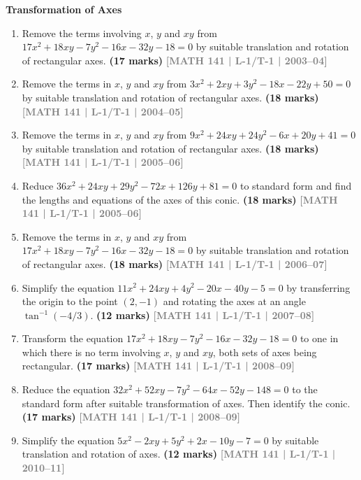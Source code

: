 \documentclass[12pt,a4paper]{article}
\newcommand{\yr}[1]{\hfill\textcolor{gray}{\small\textbf{[#1]}}}
\newcommand{\mk}[1]{\textcolor{orange!70!black}{\small\textbf{(#1 marks)}}}
\newcommand{\subtopic}[2]{%
  \vspace{10pt}
  \noindent\begin{tcolorbox}[colback=#1!8,colframe=#1,boxrule=0.6pt,arc=4pt,
    left=6pt,right=6pt,top=4pt,bottom=4pt]
    \small\bfseries\textcolor{#1}{#2}
  \end{tcolorbox}
  \vspace{2pt}
}
\begin{document}
\subtopic{cH}{Transformation of Axes}
\label{sub:s10-transform}

\begin{enumerate}

\item Remove the terms involving $x$, $y$ and $xy$ from $17x^{2}+18xy-7y^{2}-16x-32y-18=0$ by suitable translation and rotation of rectangular axes.
\mk{17} \yr{MATH 141 | L-1/T-1 | 2003--04}

\item Remove the terms in $x$, $y$ and $xy$ from $3x^{2}+2xy+3y^{2}-18x-22y+50=0$ by suitable translation and rotation of rectangular axes.
\mk{18} \yr{MATH 141 | L-1/T-1 | 2004--05}

\item Remove the terms in $x$, $y$ and $xy$ from $9x^{2}+24xy+24y^{2}-6x+20y+41=0$ by suitable translation and rotation of rectangular axes.
\mk{18} \yr{MATH 141 | L-1/T-1 | 2005--06}

\item Reduce $36x^{2}+24xy+29y^{2}-72x+126y+81=0$ to standard form and find the lengths and equations of the axes of this conic.
\mk{18} \yr{MATH 141 | L-1/T-1 | 2005--06}

\item Remove the terms in $x$, $y$ and $xy$ from $17x^{2}+18xy-7y^{2}-16x-32y-18=0$ by suitable translation and rotation of rectangular axes.
\mk{18} \yr{MATH 141 | L-1/T-1 | 2006--07}

\item Simplify the equation $11x^{2}+24xy+4y^{2}-20x-40y-5=0$ by transferring the origin to the point $(2,-1)$ and rotating the axes at an angle $\tan^{-1}(-4/3)$.
\mk{12} \yr{MATH 141 | L-1/T-1 | 2007--08}

\item Transform the equation $17x^{2}+18xy-7y^{2}-16x-32y-18=0$ to one in which there is no term involving $x$, $y$ and $xy$, both sets of axes being rectangular.
\mk{17} \yr{MATH 141 | L-1/T-1 | 2008--09}

\item Reduce the equation $32x^{2}+52xy-7y^{2}-64x-52y-148=0$ to the standard form after suitable transformation of axes. Then identify the conic.
\mk{17} \yr{MATH 141 | L-1/T-1 | 2008--09}

\item Simplify the equation $5x^{2}-2xy+5y^{2}+2x-10y-7=0$ by suitable translation and rotation of axes.
\mk{12} \yr{MATH 141 | L-1/T-1 | 2010--11}


\end{enumerate}
\end{document}
